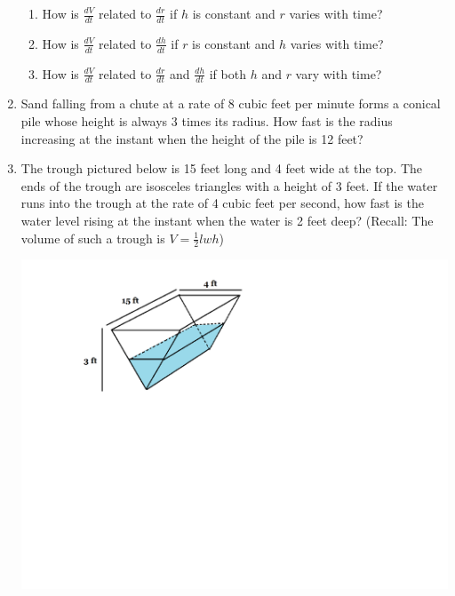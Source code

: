 \documentclass[12pt]{article}
\newif\ifans
\begin{document}
\begin{enumerate}
\begin{enumerate}

\item How is $\frac{dV}{dt}$ related to $\frac{dr}{dt}$ if $h$ is constant and $r$ varies with time?

\ifans{\fbox{$\frac{dV}{dt}=2\pi r h \frac{dr}{dt}$}} \fi

\item How is $\frac{dV}{dt}$ related to $\frac{dh}{dt}$ if $r$ is constant and $h$ varies with time?

\ifans{\fbox{$\frac{dV}{dt}=\pi r^2 \frac{dh}{dt}$}} \fi

\item How is $\frac{dV}{dt}$ related to $\frac{dr}{dt}$ and $\frac{dh}{dt}$ if both $h$ and $r$ vary with time?

\ifans{\fbox{$\frac{dV}{dt}=\pi\left(r^2 \frac{dh}{dt}+2rh \frac{dr}{dt}\right)$}} \fi

\end{enumerate}

\item Sand falling from a chute at a rate of 8 cubic feet per minute forms a conical pile whose height is always 3 times its radius.  How fast is the radius increasing at the instant when the height of the pile is 12 feet? 

\ifans{\fbox{$\frac{1}{6\pi}$ ft per min}} \fi

\item The trough pictured below is 15 feet long and 4 feet wide at the top.  The ends of the trough are isosceles triangles with a height of 3 feet.  If the water runs into the trough at the rate of 4 cubic feet per second, how fast is the water level rising at the instant when the water is 2 feet deep? (Recall: The volume of such a trough is $V=\frac{1}{2}lwh$)
\begin{center}
\includegraphics[scale=0.60]{trough.pdf}
\end{center}
\ifans{\fbox{$\frac{1}{10}$ feet per second}} \fi


\end{enumerate}
\end{document}
